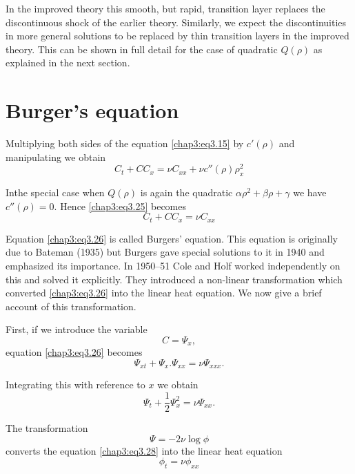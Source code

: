 In the improved theory this smooth, but rapid, transition layer replaces the discontinuous shock of the earlier theory. Similarly, we expect the discontinuities in more general solutions to be replaced by thin transition layers in the improved theory. This can be shown in full detail for the case of quadratic $Q(\rho)$ as explained in the next section.

\section{Burger's equation}\label{chap3:sec3.5}

Multiplying both sides of the equation \eqref{chap3:eq3.15} by $c'(\rho)$ and manipulating we obtain 
\begin{equation}
C_t+CC_x=\nu C_{xx}+\nu c''(\rho)\rho_x^2\tag{3.25}\label{chap3:eq3.25}
\end{equation}

In\pageoriginale the special case when $Q(\rho)$ is again the quadratic $\alpha\rho^2 +\beta\rho+\gamma$ we have $c''(\rho)=0$. Hence \eqref{chap3:eq3.25} becomes
\begin{equation*}
C_t+CC_x=\nu C_{xx} \tag{3.26}\label{chap3:eq3.26}
\end{equation*}

Equation \eqref{chap3:eq3.26} is called Burgers' equation. This equation is originally due to Bateman (1935) but Burgers gave special solutions to it in 1940 and emphasized its importance. In 1950--51 Cole and Holf worked independently on this and solved it explicitly. They introduced a non-linear transformation which converted \eqref{chap3:eq3.26} into the linear heat equation. We now give a brief account of this transformation.

First, if we introduce the variable
\begin{equation}
C=\Psi_{x},\tag{3.27}\label{chap3:eq3.27}
\end{equation}
equation \eqref{chap3:eq3.26} becomes 
$$
\Psi_{xt}+\Psi_x.\Psi_{xx}=\nu\Psi_{xxx}.
$$

Integrating this with reference to $x$ we obtain
\begin{equation}
\Psi_t+\frac{1}{2}\Psi_x^2=\nu\Psi_{xx}.\tag{3.28}\label{chap3:eq3.28}
\end{equation}

The transformation
\begin{equation}
\Psi =-2\nu\log \phi\tag{3.29}\label{chap3:eq3.29}
\end{equation}
converts the equation \eqref{chap3:eq3.28} into the linear heat equation 
\begin{equation}
\phi_t=\nu\phi_{xx}\tag{3.30}\label{chap3:eq3.30}
\end{equation}

